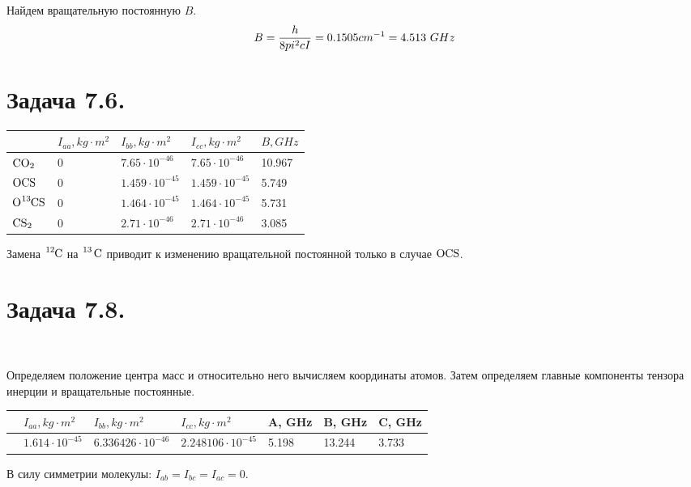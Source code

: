 \documentclass[14pt]{article}
\begin{document}
Найдем вращательную постоянную $B$.
\begin{gather}
B = \frac{h}{8 pi^2 c I} = 0.1505 cm^{-1} = 4.513 \ GHz \notag
\end{gather}

\section*{Задача 7.6.}
\renewcommand{\arraystretch}{1.6}
\begin{table}[H]
\begin{center}
\begin{tabular}{|P{1.5cm}|P{2cm}|P{2cm}|P{2cm}|P{2cm}|}
\hline
& $I_{aa}, kg \cdot m^2$ & $I_{bb}, kg \cdot m^2$ & $I_{cc}, kg \cdot m^2$ & $B, GHz$  \\ \hline
$\ce{CO2}$ & 0 & $7.65 \cdot 10^{-46}$ & $7.65 \cdot 10^{-46}$ & 10.967 \\ \hline
$\ce{OCS}$ & 0 & $1.459 \cdot 10^{-45}$ & $1.459 \cdot 10^{-45}$ & 5.749 \\ \hline
$\ce{O{}^{13}CS}$ & 0 & $1.464 \cdot 10^{-45}$ & $1.464 \cdot 10^{-45}$ & 5.731 \\ \hline
$\ce{CS2}$ & 0 & $2.71 \cdot 10^{-46}$ & $2.71 \cdot 10^{-46}$ & 3.085 \\ \hline
\end{tabular} 
\end{center}
\end{table}    

Замена $\ce{{}^12C}$ на $\ce{{}^13 C}$ приводит к изменению вращательной постоянной только в случае $\ce{OCS}$. 

\section*{Задача 7.8.}
\begin{center}
 \\ 
[\baselineskip]
\end{center}

Определяем положение центра масс и относительно него вычисляем координаты атомов. Затем определяем главные компоненты тензора инерции и вращательные постоянные.

\begin{table}[H]
\begin{center}
\begin{tabular}{|P{1.5cm}|P{3cm}|P{3cm}|P{3cm}|P{1.5cm}|P{1.5cm}|P{1.5cm}|}
\hline
 & $I_{aa}, kg \cdot m^2$ & $I_{bb}, kg \cdot m^2$ & $I_{cc}, kg \cdot m^2$ & A, GHz & B, GHz & C, GHz \\ \hline
  & $1.614 \cdot 10^{-45}$ & $6.336426 \cdot 10^{-46}$ & $2.248106 \cdot 10^{-45}$ & 5.198 & 13.244 & 3.733 \\ \hline
\end{tabular}
\end{center}
\end{table} 

В силу симметрии молекулы: $I_{ab} = I_{bc} = I_{ac} = 0$.
\end{document}
